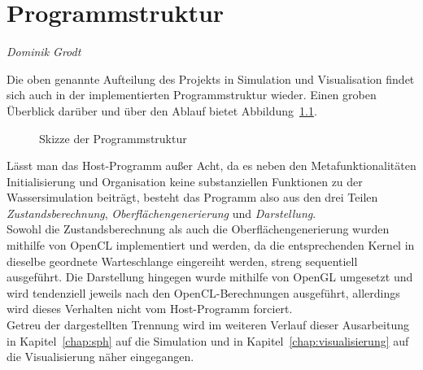 \chapter{Programmstruktur}
\thispagestyle{empty}

\begin{center}
\emph{{\small Dominik Grodt}}
\end{center}

\bigskip

Die oben genannte Aufteilung des Projekts in Simulation und Visualisation findet sich auch in der implementierten Programmstruktur wieder. Einen groben Überblick darüber und über den Ablauf bietet Abbildung~\ref{fig:programmstruktur}.\\
\begin{figure}
  \centering
    
  \caption{Skizze der Programmstruktur}
  \label{fig:programmstruktur}
\end{figure}
Lässt man das Host-Programm außer Acht, da es neben den Metafunktionalitäten Initialisierung und Organisation keine substanziellen Funktionen zu der Wassersimulation beiträgt, besteht das Programm also aus den drei Teilen \textit{Zustandsberechnung}, \textit{Oberflächengenerierung} und \textit{Darstellung}. \\
Sowohl die Zustandsberechnung als auch die Oberflächengenerierung wurden mithilfe von OpenCL implementiert und werden, da die entsprechenden Kernel in dieselbe geordnete Warteschlange eingereiht werden, streng sequentiell ausgeführt. Die Darstellung hingegen wurde mithilfe von OpenGL umgesetzt und wird tendenziell jeweils nach den OpenCL-Berechnungen ausgeführt, allerdings wird dieses Verhalten nicht vom Host-Programm forciert.\\
Getreu der dargestellten Trennung wird im weiteren Verlauf dieser Ausarbeitung in Kapitel~\ref{chap:sph} auf die Simulation und in Kapitel~\ref{chap:visualisierung} auf die Visualisierung näher eingegangen.